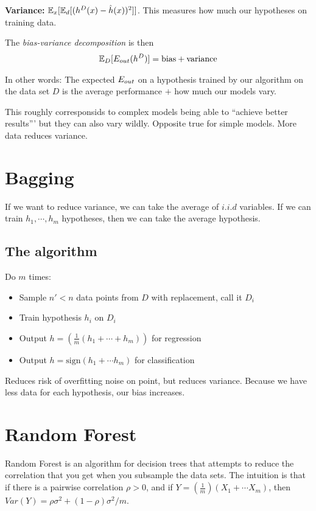 \documentclass{article}
\begin{document}
    \textbf{Variance:} $\mathbb{E}_x[\mathbb{E}_d[(h^D(x) - \hat{h}(x))^2]]$. This measures how much our hypotheses on training data. 

    The \emph{bias-variance decomposition} is then 
    \begin{align}
      \mathbb{E}_D[E_{out}(h^D)] = \text{bias} + \text{variance}
    \end{align}

    In other words: The expected $E_{out}$ on a hypothesis trained by our algorithm on the data set $D$ is the average performance $+$ how much our models vary.
    
    This roughly corresponsids to complex models being able to ``achieve better results''' but they can also vary wildly. Opposite true for simple models. More data reduces variance.
    

\section{Bagging}
  If we want to reduce variance, we can take the average of $i.i.d$ variables. If we can train $h_1, \cdots, h_m$ hypotheses, then we can take the average hypothesis. 

  \subsection{The algorithm}
    Do $m$ times:
    \begin{itemize}
      \item Sample $n' < n$ data points from $D$ with replacement, call it $D_i$
      \item Train hypothesis $h_i$ on $D_i$
      \item Output $h = (\frac{1}{m}(h_1 + \cdots + h_m))$ for regression
      \item Output $h = \text{sign}(h_1 + \cdots h_m)$ for classification
    \end{itemize}
    Reduces risk of overfitting noise on point, but reduces variance. Because we have less data for each hypothesis, our bias increases.

\section{Random Forest}
  Random Forest is an algorithm for decision trees that attempts to reduce the correlation that you get when you subsample the data sets. The intuition is that if there is a pairwise correlation $\rho > 0$, and if $Y = (\frac{1}{m})(X_1 + \cdots X_m)$, then $Var(Y) = \rho \sigma^2 + (1 - \rho)\sigma^2/m$. 
\end{document}
